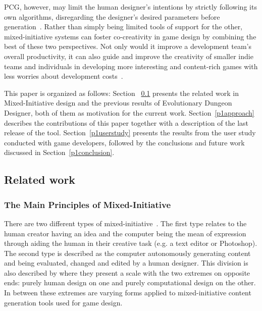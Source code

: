 PCG, however, may limit the human designer’s intentions by strictly following its own algorithms, disregarding the designer’s desired parameters before generation~. Rather than simply being limited tools of support for the other, mixed-initiative systems can foster co-creativity in game design by combining the best of these two perspectives. Not only would it improve a development team’s overall productivity, it can also guide and improve the creativity of smaller indie teams and individuals in developing more interesting and content-rich games with less worries about development costs~. 

This paper is organized as follows: Section ~\ref{p1background} presents the related work in Mixed-Initiative design and the previous results of Evolutionary Dungeon Designer, both of them as motivation for the current work. Section~\ref{p1approach} describes the contributions of this paper together with a description of the last release of the tool. Section~\ref{p1userstudy} presents the results from the user study conducted with game developers, followed by the conclusions and future work discussed in Section~\ref{p1conclusion}.

\subsection{Related work} \label{p1background}
\subsubsection{The Main Principles of Mixed-Initiative}

There are two different types of mixed-initiative~. The first type relates to the human creator having an idea and the computer being the mean of expression through aiding the human in their creative task (e.g. a text editor or Photoshop). The second type is described as the computer autonomously generating content and being evaluated, changed and edited by a human designer. This division is also described by  where they present a scale with the two extremes on opposite ends: purely human design on one and purely computational design on the other. In between these extremes are varying forms applied to mixed-initiative content generation tools used for game design. 

